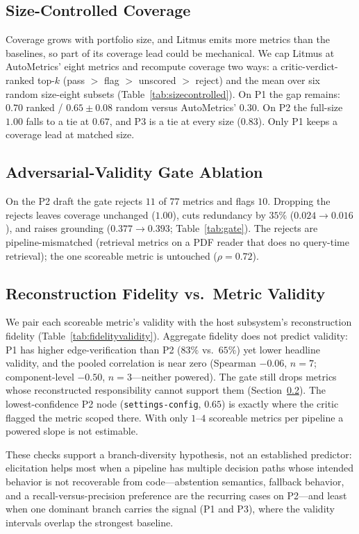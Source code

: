 \documentclass[11pt]{article}
\begin{document}
\subsection{Size-Controlled Coverage}
\label{sec:sizecontrolled}
Coverage grows with portfolio size, and Litmus emits more metrics than the baselines, so part of its coverage lead could be mechanical. We cap Litmus at AutoMetrics' eight metrics and recompute coverage two ways: a critic-verdict-ranked top-$k$ (pass $>$ flag $>$ unscored $>$ reject) and the mean over six random size-eight subsets (Table~\ref{tab:sizecontrolled}). On P1 the gap remains: $0.70$ ranked / $0.65\pm0.08$ random versus AutoMetrics' $0.30$. On P2 the full-size $1.00$ falls to a tie at $0.67$, and P3 is a tie at every size ($0.83$). Only P1 keeps a coverage lead at matched size.

\subsection{Adversarial-Validity Gate Ablation}
\label{sec:gateablation}
On the P2 draft the gate rejects $11$ of $77$ metrics and flags $10$. Dropping the rejects leaves coverage unchanged ($1.00$), cuts redundancy by $35\%$ ($0.024\rightarrow0.016$), and raises grounding ($0.377\rightarrow0.393$; Table~\ref{tab:gate}). The rejects are pipeline-mismatched (retrieval metrics on a PDF reader that does no query-time retrieval); the one scoreable metric is untouched ($\rho=0.72$).

\subsection{Reconstruction Fidelity vs.\ Metric Validity}
\label{sec:fidelityvalidity}
We pair each scoreable metric's validity with the host subsystem's reconstruction fidelity (Table~\ref{tab:fidelityvalidity}). Aggregate fidelity does not predict validity: P1 has higher edge-verification than P2 ($83\%$ vs.\ $65\%$) yet lower headline validity, and the pooled correlation is near zero (Spearman $-0.06$, $n{=}7$; component-level $-0.50$, $n{=}3$---neither powered). The gate still drops metrics whose reconstructed responsibility cannot support them (Section~\ref{sec:gateablation}). The lowest-confidence P2 node (\texttt{settings-config}, $0.65$) is exactly where the critic flagged the metric scoped there. With only $1$--$4$ scoreable metrics per pipeline a powered slope is not estimable.

These checks support a branch-diversity hypothesis, not an established predictor: elicitation helps most when a pipeline has multiple decision paths whose intended behavior is not recoverable from code---abstention semantics, fallback behavior, and a recall-versus-precision preference are the recurring cases on P2---and least when one dominant branch carries the signal (P1 and P3), where the validity intervals overlap the strongest baseline.
\end{document}
